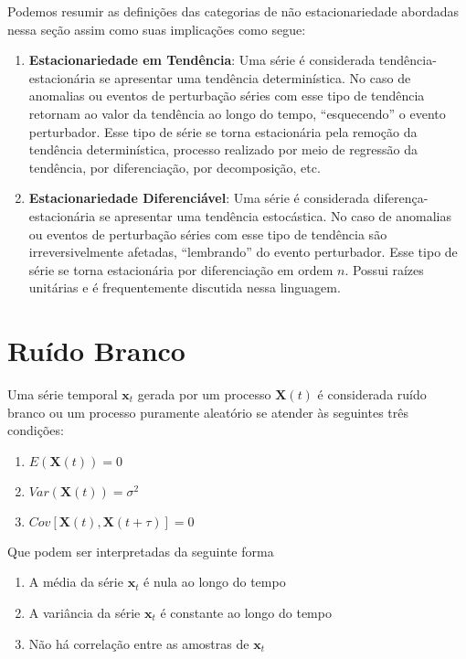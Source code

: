 Podemos resumir as definições das categorias de não estacionariedade abordadas
nessa seção assim como suas implicações como segue:

\begin{enumerate}
    \item \textbf{Estacionariedade em Tendência}: Uma série é considerada
        tendência-estacionária se apresentar uma tendência determinística. No
        caso de anomalias ou eventos de perturbação séries com esse tipo de
        tendência retornam ao valor da tendência ao longo do tempo,
        ``esquecendo'' o evento perturbador. Esse tipo de série se torna
        estacionária pela remoção da tendência determinística, processo
        realizado por meio de regressão da tendência, por diferenciação, por
        decomposição, etc.
    \item \textbf{Estacionariedade Diferenciável}: Uma série é considerada
        diferença-estacionária se apresentar uma tendência estocástica. No
        caso de anomalias ou eventos de perturbação séries com esse tipo de
        tendência são irreversivelmente afetadas,
        ``lembrando'' do evento perturbador. Esse tipo de série se torna
        estacionária por diferenciação em ordem $n$. Possui raízes unitárias
        e é frequentemente discutida nessa linguagem.

\end{enumerate}

\section{Ruído Branco}\label{sec:white_noise}

Uma série temporal $\mathbf{x}_t$ gerada por um processo $\mathbf{X}(t)$ é
considerada ruído branco ou um processo puramente aleatório se atender às
seguintes três condições:

\begin{enumerate}
    \item $E(\mathbf{X}(t)) = 0$
    \item $Var(\mathbf{X}(t)) = \sigma^2$
    \item $Cov[\mathbf{X}(t), \mathbf{X}(t+\tau)] = 0$
\end{enumerate}\vspace{.5cm}

Que podem ser interpretadas da seguinte forma

\begin{enumerate}
    \item A média da série $\mathbf{x}_t$ é nula ao longo do tempo
    \item A variância da série $\mathbf{x}_t$ é constante ao longo do tempo
    \item Não há correlação entre as amostras de $\mathbf{x}_t$
\end{enumerate}\vspace{.5cm}

